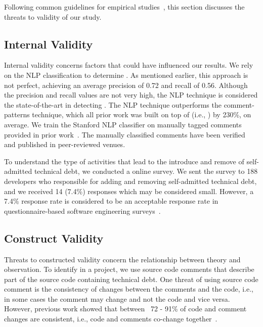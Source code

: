 Following common guidelines for empirical studies~\cite{yin2013case},  this section discusses the threats to validity of our study.

\subsection{Internal Validity} Internal validity concerns factors that could
have influenced our results. We rely on the NLP classification to determine \SATD. As mentioned earlier, this approach is not perfect, achieving an average precision of 0.72 and recall of 0.56. Although the precision and recall values are not very high, the NLP technique is considered the state-of-the-art in detecting \SATD. The NLP technique outperforms the comment-patterns technique, which all prior work was built on top of (i.e., \cite{Wehaibi2016SANER,Bavota2016MSR,Potdar2014ICSME}) by 230\%, on average. We train the Stanford NLP classifier on manually tagged \SATD comments provided in prior work~\cite{Maldonado2015TSE}. The manually classified comments have been verified and published in peer-reviewed venues. 


To understand the type of activities that lead to the introduce and remove of self-admitted technical debt, we conducted a online survey. We sent the survey to 188 developers who responsible for adding and removing self-admitted technical debt, and we received 14 (7.4\%) responses which may be considered small. However, a 7.4\% response rate is considered to be an acceptable response rate in questionnaire-based software engineering surveys~\cite{singer2008software}.

\subsection{Construct Validity} Threats to constructed validity concern the relationship between theory and observation.
To identify \SATD in a project, we use source code comments that describe part of the source code containing technical debt. One threat of using source code comment is the consistency of changes between the comments and the code, i.e., in some cases the comment may change and not the code and vice versa. However, previous work showed that between ~72 - 91\% of code and comment changes are consistent, i.e., code and comments co-change together~\cite{Potdar2014ICSME}.

